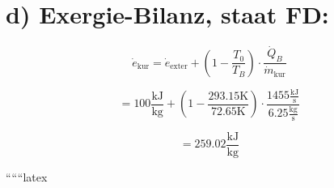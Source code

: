 \section*{d) Exergie-Bilanz, staat FD:}

\[
\dot{e}_{\text{kur}} = \dot{e}_{\text{exter}} + \left( 1 - \frac{T_0}{T_B} \right) \cdot \frac{\dot{Q}_B}{\dot{m}_{\text{kur}}}
\]

\[
= 100 \frac{\text{kJ}}{\text{kg}} + \left( 1 - \frac{293.15 \text{K}}{72.65 \text{K}} \right) \cdot \frac{1455 \frac{\text{kJ}}{\text{s}}}{6.25 \frac{\text{kg}}{\text{s}}}
\]

\[
= 259.02 \frac{\text{kJ}}{\text{kg}}
\]

``````latex